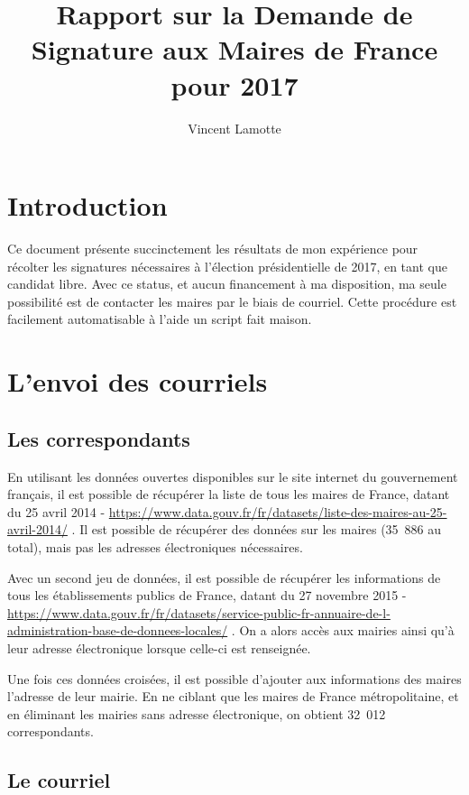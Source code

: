 \documentclass{article}
\begin{document}
\title{Rapport sur la Demande de Signature aux Maires de France pour 2017}
\author{Vincent Lamotte}

\maketitle

\section{Introduction}
Ce document présente succinctement les résultats de mon expérience pour récolter les signatures nécessaires à l'élection présidentielle de 2017, en tant que candidat libre. Avec ce status, et aucun financement à ma disposition, ma seule possibilité est de contacter les maires par le biais de courriel. Cette procédure est facilement automatisable à l'aide un script fait maison.

\section{L'envoi des courriels}

\subsection{Les correspondants}

En utilisant les données ouvertes disponibles sur le site internet du gouvernement français, il est possible de récupérer la liste de tous les maires de France, datant du 25 avril 2014 - \url{https://www.data.gouv.fr/fr/datasets/liste-des-maires-au-25-avril-2014/} . Il est possible de récupérer des données sur les maires (35~886 au total), mais pas les adresses électroniques nécessaires.

Avec un second jeu de données, il est possible de récupérer les informations de tous les établissements publics de France, datant du 27 novembre 2015 - \url{https://www.data.gouv.fr/fr/datasets/service-public-fr-annuaire-de-l-administration-base-de-donnees-locales/} . On a alors accès aux mairies ainsi qu'à leur adresse électronique lorsque celle-ci est renseignée.

Une fois ces données croisées, il est possible d'ajouter aux informations des maires l'adresse de leur mairie. En ne ciblant que les maires de France métropolitaine, et en éliminant les mairies sans adresse électronique, on obtient 32~012 correspondants.

\subsection{Le courriel}
\end{document}
